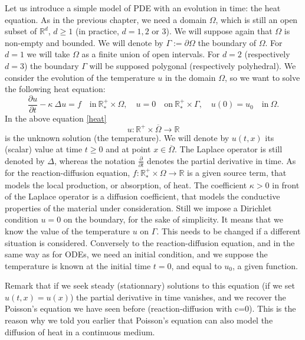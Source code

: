 \documentclass{article}
\begin{document}
Let us introduce a simple model of PDE with an evolution in time: the heat equation. As in the previous chapter, we need a domain $\Omega$, which is still an open subset of $\mathbb{R}^d$, $d\geq1$ (in practice, $d=1,2$ or $3$). We will suppose again that $\Omega$ is non-empty and bounded. We will denote by $\Gamma:= \partial \Omega$ the boundary of $\Omega$.
For $d=1$ we will take $\Omega$ as a finite union of open intervals. For $d=2$ (respectively $d=3$) the boundary $\Gamma$ will be supposed polygonal (respectively polyhedral). We consider the evolution of the temperature $u$ in the domain $\Omega$, so we want to solve the following heat equation:
\begin{equation}\label{heat}
\frac{\partial u}{\partial t} - \kappa\ \Delta u = f \quad \mathrm{in}\ \mathbb{R}^+_* \times \Omega, \quad u = 0 \quad \mathrm{on}\ \mathbb{R}^+_* \times\Gamma,
\quad u(0)=u_0 \quad \mathrm{in}\ \Omega.
\end{equation}
In the above equation \eqref{heat} $$u : \mathbb{R}^+ \times \overline{\Omega} \rightarrow \mathbb{R}$$ is the unknown solution (the temperature). We will denote by $u(t,x)$ its (scalar) value at time $t\geq 0$ and at point $x \in \overline{\Omega}$.
The Laplace operator is still denoted by $\Delta$, whereas the notation $\frac{\partial}{\partial t}$ denotes the partial derivative in time.
As for the reaction-diffusion equation, $f : \mathbb{R}^+_* \times \Omega \rightarrow \mathbb{R}$ is a given source term, that models the local production, or absorption, of heat. The coefficient $\kappa > 0$ in front of the Laplace operator is a diffusion coefficient, that models the conductive properties of the material under consideration. Still we impose a Dirichlet condition $u=0$ on the boundary, for the sake of simplicity. It means that we know the value of the temperature $u$ on $\Gamma$. This needs to be changed if a different situation is considered. Conversely to the reaction-diffusion equation, and in the same way as for ODEs, we need an initial condition, and we suppose the temperature is known at the initial time $t=0$, and equal to $u_0$, a given function. 

Remark that if we seek steady (stationnary) solutions to this equation (if we set $u(t,x)=u(x)$) the partial derivative in time vanishes, and we recover the Poisson's equation we have seen before (reaction-diffusion with c=0). This is the reason why we told you earlier that Poisson's equation can also model the diffusion of heat in a continuous medium.
\end{document}
